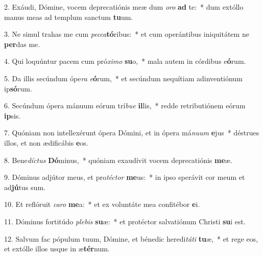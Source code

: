 2. Exáudi, Dómine, vocem deprecatiónis meæ dum \textit{o}\textit{ro} \textbf{ad} te:~*  dum extóllo manus meas ad templum sanctum \textbf{tu}um.\

3. Ne simul trahas me cum \textit{pec}\textit{ca}\textbf{tó}ribus:~*  et cum operántibus iniquitátem ne \textbf{per}das me.\

4. Qui loquúntur pacem cum pró\textit{xi}\textit{mo} \textbf{su}o,~*  mala autem in córdibus e\textbf{ó}rum.\

5. Da illis secúndum ópe\textit{ra} \textit{e}\textbf{ó}rum,~*  et secúndum nequítiam adinventiónum ip\textbf{só}rum.\

6. Secúndum ópera mánuum eórum trí\textit{bu}\textit{e} \textbf{il}lis,~*  redde retributiónem eórum \textbf{ip}sis.\

7. Quóniam non intellexérunt ópera Dómini, et in ópera má\textit{nu}\textit{um} \textbf{e}jus~*  déstrues illos, et non ædificábis \textbf{e}os.\

8. Bene\textit{díc}\textit{tus} \textbf{Dó}minus,~*  quóniam exaudívit vocem deprecatiónis \textbf{me}æ.\

9. Dóminus adjútor meus, et pro\textit{téc}\textit{tor} \textbf{me}us:~*  in ipso sperávit cor meum et ad\textbf{jú}tus sum.\

10. Et reflóruit \textit{ca}\textit{ro} \textbf{me}a:~*  et ex voluntáte mea confitébor \textbf{e}i.\

11. Dóminus fortitúdo \textit{ple}\textit{bis} \textbf{su}æ:~*  et protéctor salvatiónum Christi \textbf{su}i est.\

12. Salvum fac pópulum tuum, Dómine, et bénedic heredi\textit{tá}\textit{ti} \textbf{tu}æ,~*  et rege eos, et extólle illos usque in æ\textbf{tér}num.\

